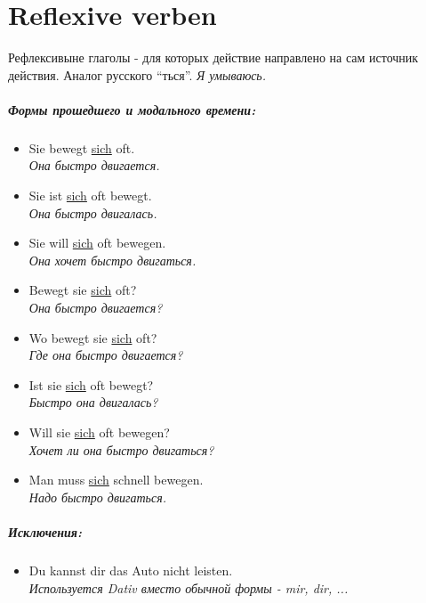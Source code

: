 \documentclass[12pt,a4paper]{report}
\newcommand{\satzew}[1]{\underline{#1}}
\newcommand{\ubersatze}[1]{\textit{#1}}
\begin{document}
\chapter{Reflexive verben}
Рефлексивыне глаголы - для которых действие направлено на сам источник действия. Аналог русского ``ться''. \ubersatze{Я умываюсь.}
\paragraph{Формы прошедшего и модального времени:}
\begin{itemize}
\item Sie bewegt \satzew{sich} oft.
~\\ \ubersatze{Она быстро двигается.}
\item Sie ist \satzew{sich} oft bewegt.
~\\ \ubersatze{Она быстро двигалась.}
\item Sie will \satzew{sich} oft bewegen.
~\\ \ubersatze{Она хочет быстро двигаться.}
\item Bewegt sie \satzew{sich} oft?
~\\ \ubersatze{Она быстро двигается?}
\item Wo bewegt sie \satzew{sich} oft?
~\\ \ubersatze{Где она быстро двигается?}
\item Ist sie \satzew{sich} oft bewegt?
~\\ \ubersatze{Быстро она двигалась?}
\item Will sie \satzew{sich} oft bewegen?
~\\ \ubersatze{Хочет ли она быстро двигаться?}
\item Man muss \satzew{sich} schnell bewegen.
~\\ \ubersatze{Надо быстро двигаться.}
\end{itemize}

\paragraph{Исключения:}
\begin{itemize}
\item Du  kannst dir das Auto nicht leisten.
~\\ \ubersatze{Используется Dativ вместо обычной формы - mir, dir, ...}
\end{itemize}
\end{document}
